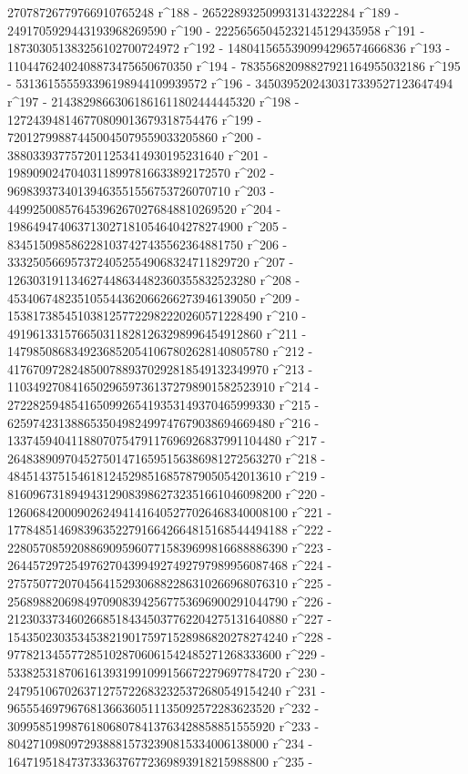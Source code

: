        27078726779766910765248 r^188 - 
       265228932509931314322284 r^189 - 
       2491705929443193968269590 r^190 - 
       22256565045232145129435958 r^191 - 
       187303051383256102700724972 r^192 - 
       1480415655390994296574666836 r^193 - 
       11044762402408873475650670350 r^194 - 
       78355682098827921164955032186 r^195 - 
       531361555593396198944109939572 r^196 - 
       3450395202430317339527123647494 r^197 - 
       21438298663061861611802444445320 r^198 - 
       127243948146770809013679318754476 r^199 - 
       720127998874450045079559033205860 r^200 - 
       3880339377572011253414930195231640 r^201 - 
       19890902470403118997816633892172570 r^202 - 
       96983937340139463551556753726070710 r^203 - 
       449925008576453962670276848810269520 r^204 - 
       1986494740637130271810546404278274900 r^205 - 
       8345150985862281037427435562364881750 r^206 - 
       33325056695737240525549068324711829720 r^207 - 
       126303191134627448634482360355832523280 r^208 - 
       453406748235105544362066266273946139050 r^209 - 
       1538173854510381257722982220260571228490 r^210 - 
       4919613315766503118281263298996454912860 r^211 - 
       14798508683492368520541067802628140805780 r^212 - 
       41767097282485007889370292818549132349970 r^213 - 
       110349270841650296597361372798901582523910 r^214 - 
       272282594854165099265419353149370465999330 r^215 - 
       625974231388653504982499747679038694669480 r^216 - 
       1337459404118807075479117696926837991104480 r^217 - 
       2648389097045275014716595156386981272563270 r^218 - 
       4845143751546181245298516857879050542013610 r^219 - 
       8160967318949431290839862732351661046098200 r^220 - 
       12606842000902624941416405277026468340008100 r^221 - 
       17784851469839635227916642664815168544494188 r^222 - 
       22805708592088690959607715839699816688886390 r^223 - 
       26445729725497627043994927492797989956087468 r^224 - 
       27575077207045641529306882286310266968076310 r^225 - 
       25689882069849709083942567753696900291044790 r^226 - 
       21230337346026685184345037762204275131640880 r^227 - 
       15435023035345382190175971528986820278274240 r^228 - 
       9778213455772851028706061542485271268333600 r^229 - 
       5338253187061613931991099156672279697784720 r^230 - 
       2479510670263712757226832325372680549154240 r^231 - 
       965554697967681366360511135092572283623520 r^232 - 
       309958519987618068078413763428858851555920 r^233 - 
       80427109809729388815732390815334006138000 r^234 - 
       16471951847373336376772369893918215988800 r^235 - 
